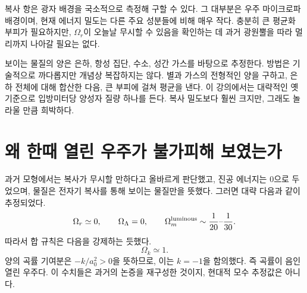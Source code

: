 \begin{classroomqa}
\end{classroomqa}

복사 항은 광자 배경을 국소적으로 측정해 구할 수 있다. 그 대부분은 우주 마이크로파 배경이며, 현재 에너지 밀도는 다른 주요 성분들에 비해 매우 작다. 충분히 큰 평균화 부피가 필요하지만, \(\Omega_r\)이 오늘날 무시할 수 있음을 확인하는 데 과거 광원뿔을 따라 멀리까지 나아갈 필요는 없다.

보이는 물질의 양은 은하, 항성 집단, 수소, 성간 가스를 바탕으로 추정한다. 방법은 기술적으로 까다롭지만 개념상 복잡하지는 않다. 별과 가스의 전형적인 양을 구하고, 은하 전체에 대해 합산한 다음, 큰 부피에 걸쳐 평균을 낸다. 이 강의에서는 대략적인 옛 기준으로 입방미터당 양성자 질량 하나를 든다. 복사 밀도보다 훨씬 크지만, 그래도 놀라울 만큼 희박하다.

\begin{classroomqa}
\end{classroomqa}

\section{왜 한때 열린 우주가 불가피해 보였는가}

과거 모형에서는 복사가 무시할 만하다고 올바르게 판단했고, 진공 에너지는 0으로 두었으며, 물질은 전자기 복사를 통해 보이는 물질만을 뜻했다. 그러면 대략 다음과 같이 추정되었다.
\begin{equation}
\Omega_r\simeq0,
\qquad
\Omega_\Lambda=0,
\qquad
\Omega_m^{\rm luminous}\sim\frac{1}{20}\text{--}\frac{1}{30}.
\end{equation}
따라서 합 규칙은 다음을 강제하는 듯했다.
\begin{equation}
\Omega_k\simeq1.
\end{equation}
양의 곡률 기여분은 \(-k/a_0^2>0\)을 뜻하므로, 이는 \(k=-1\)을 함의했다. 즉 곡률이 음인 열린 우주다. 이 수치들은 과거의 논증을 재구성한 것이지, 현대적 모수 추정값은 아니다.

